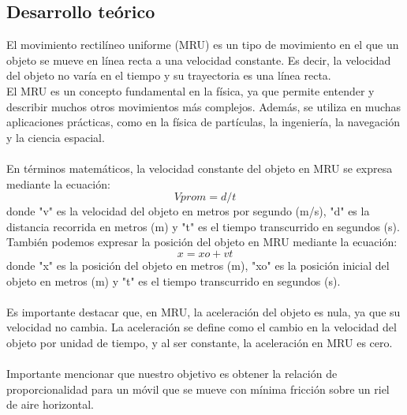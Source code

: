 \documentclass{article}
\begin{document}

\begin{multicols}{2}



\section*{Desarrollo teórico}\label{Desarrollo Teorico}                              	%

El movimiento rectilíneo uniforme (MRU) es un tipo de movimiento en el que un objeto se mueve en línea recta a una velocidad constante. Es decir, la velocidad del objeto no varía en el tiempo y su trayectoria es una línea recta.
\\

El MRU es un concepto fundamental en la física, ya que permite entender y describir muchos otros movimientos más complejos. Además, se utiliza en muchas aplicaciones prácticas, como en la física de partículas, la ingeniería, la navegación y la ciencia espacial.
\\
\\
En términos matemáticos, la velocidad constante del objeto en MRU se expresa mediante la ecuación:
\begin{equation}\label{Ec:1}
	Vprom = d/t
\end{equation}
donde "v" es la velocidad del objeto en metros por segundo (m/s), "d" es la distancia recorrida en metros (m) y "t" es el tiempo transcurrido en segundos (s).
\\
También podemos expresar la posición del objeto en MRU mediante la ecuación:
\begin{equation}\label{Ec:2}
	x = xo + vt
\end{equation}
donde "x" es la posición del objeto en metros (m), "xo" es la posición inicial del objeto en metros (m) y "t" es el tiempo transcurrido en segundos (s).
\\
\\
Es importante destacar que, en MRU, la aceleración del objeto es nula, ya que su velocidad no cambia. La aceleración se define como el cambio en la velocidad del objeto por unidad de tiempo, y al ser constante, la aceleración en MRU es cero.
\\
\\
Importante mencionar que nuestro objetivo es obtener la relación de proporcionalidad para un móvil que se mueve con mínima fricción sobre un riel de aire horizontal. 

\end{multicols}
\end{document}
